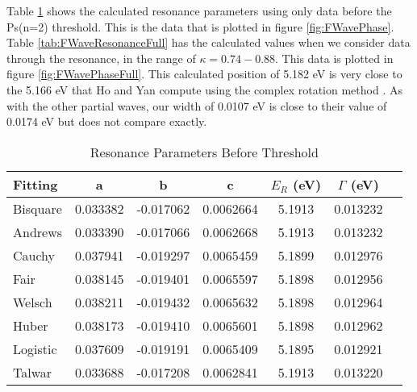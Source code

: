 \documentclass[Dissertation.tex]{subfiles}
\begin{document}
Table \ref{tab:FWaveResonanceBefore} shows the calculated resonance parameters using only data before the Ps(n=2) threshold. This is the data that is plotted in figure \ref{fig:FWavePhase}. Table \ref{tab:FWaveResonanceFull} has the calculated values when we consider data through the resonance, in the range of $\kappa = 0.74 - 0.88$. This data is plotted in figure \ref{fig:FWavePhaseFull}. This calculated position of 5.182 eV is very close to the 5.166 eV that Ho and Yan compute using the complex rotation method \cite{Ho2000}. As with the other partial waves, our width of 0.0107 eV is close to their value of 0.0174 eV but does not compare exactly.


\setlength{\abovecaptionskip}{6pt}
\setlength{\belowcaptionskip}{6pt}
\begin{table}[H]
\centering
\begin{tabular}{l c c c c c c}
\toprule
Fitting & a & b & c & $E_R$ (eV) & $\Gamma$ (eV) \\
\midrule
Bisquare	& 0.033382 & -0.017062 & 0.0062664 & 5.1913 & 0.013232 \\
Andrews		& 0.033390 & -0.017066 & 0.0062668 & 5.1913 & 0.013232 \\
Cauchy		& 0.037941 & -0.019297 & 0.0065459 & 5.1899 & 0.012976 \\
Fair			& 0.038145 & -0.019401 & 0.0065597 & 5.1898 & 0.012956 \\
Welsch		& 0.038211 & -0.019432 & 0.0065632 & 5.1898 & 0.012964 \\
Huber			& 0.038173 & -0.019410 & 0.0065601 & 5.1898 & 0.012962 \\
Logistic	& 0.037609 & -0.019191 & 0.0065409 & 5.1895 & 0.012921 \\
Talwar		& 0.033688 & -0.017208 & 0.0062841 & 5.1913 & 0.013220 \\
\bottomrule
\end{tabular}
\caption{Resonance Parameters Before Threshold}
\label{tab:FWaveResonanceBefore}
\end{table}
\end{document}
